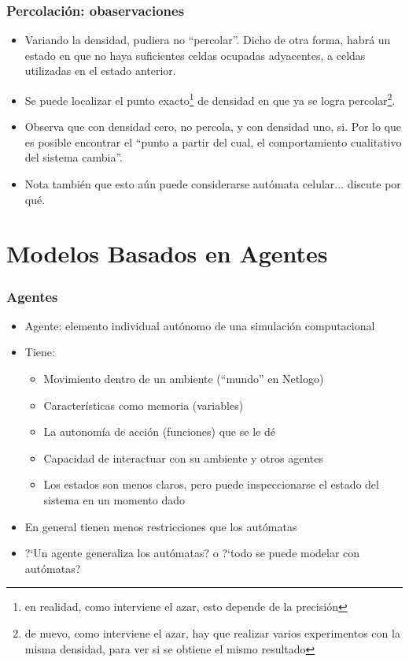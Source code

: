\documentclass{beamer}
\begin{document}
\begin{frame}[t]
\frametitle{Percolación: obaservaciones}
\begin{itemize}[<+-| alert@+>]
	\item Variando la densidad, pudiera no ``percolar''. Dicho de otra forma, habrá un estado en que no haya suficientes celdas ocupadas adyacentes, a celdas utilizadas en el estado anterior.
	\item Se puede localizar el punto exacto\footnote{en realidad, como interviene el azar, esto depende de la precisión} de densidad en que ya se logra percolar\footnote{de nuevo, como interviene el azar, hay que realizar varios experimentos con la misma densidad, para ver si se obtiene el mismo resultado}.
	\item Observa que con densidad cero, no percola, y con densidad uno, si. Por lo que es posible encontrar el ``punto a partir del cual, el comportamiento cualitativo del sistema cambia''.
	\item Nota también que esto aún puede considerarse autómata celular... discute por qué.
\end{itemize}
\end{frame}

\section{Modelos Basados en Agentes}

\begin{frame}[t]
\frametitle{Agentes}
\begin{itemize}[<+-| alert@+>]
	\item Agente: elemento individual autónomo de una simulación computacional
	\item Tiene:
	\begin{itemize}[<+-| alert@+>]
		\item Movimiento dentro de un ambiente (``mundo'' en Netlogo)
		\item Características como memoria (variables)
		\item La autonomía de acción (funciones) que se le dé
		\item Capacidad de interactuar con su ambiente y otros agentes
		\item Los estados son menos claros, pero puede inspeccionarse el estado del sistema en un momento dado
	\end{itemize}
	\item En general tienen menos restricciones que los autómatas
	\item ?`Un agente generaliza los autómatas? o ?`todo se puede modelar con autómatas?
\end{itemize}
\end{frame}
\end{document}
